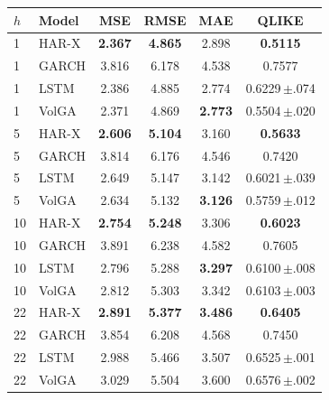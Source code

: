 \begin{tabular}{llcccc}
\toprule
$h$ & Model & MSE & RMSE & MAE & QLIKE \\
\midrule
1 & HAR-X & \textbf{2.367} & \textbf{4.865} & 2.898 & \textbf{0.5115} \\
1 & GARCH & 3.816 & 6.178 & 4.538 & 0.7577 \\
1 & LSTM & 2.386 & 4.885 & 2.774 & 0.6229\,$\pm$.074 \\
1 & VolGA & 2.371 & 4.869 & \textbf{2.773} & 0.5504\,$\pm$.020 \\
\midrule
5 & HAR-X & \textbf{2.606} & \textbf{5.104} & 3.160 & \textbf{0.5633} \\
5 & GARCH & 3.814 & 6.176 & 4.546 & 0.7420 \\
5 & LSTM & 2.649 & 5.147 & 3.142 & 0.6021\,$\pm$.039 \\
5 & VolGA & 2.634 & 5.132 & \textbf{3.126} & 0.5759\,$\pm$.012 \\
\midrule
10 & HAR-X & \textbf{2.754} & \textbf{5.248} & 3.306 & \textbf{0.6023} \\
10 & GARCH & 3.891 & 6.238 & 4.582 & 0.7605 \\
10 & LSTM & 2.796 & 5.288 & \textbf{3.297} & 0.6100\,$\pm$.008 \\
10 & VolGA & 2.812 & 5.303 & 3.342 & 0.6103\,$\pm$.003 \\
\midrule
22 & HAR-X & \textbf{2.891} & \textbf{5.377} & \textbf{3.486} & \textbf{0.6405} \\
22 & GARCH & 3.854 & 6.208 & 4.568 & 0.7450 \\
22 & LSTM & 2.988 & 5.466 & 3.507 & 0.6525\,$\pm$.001 \\
22 & VolGA & 3.029 & 5.504 & 3.600 & 0.6576\,$\pm$.002 \\
\bottomrule
\end{tabular}
